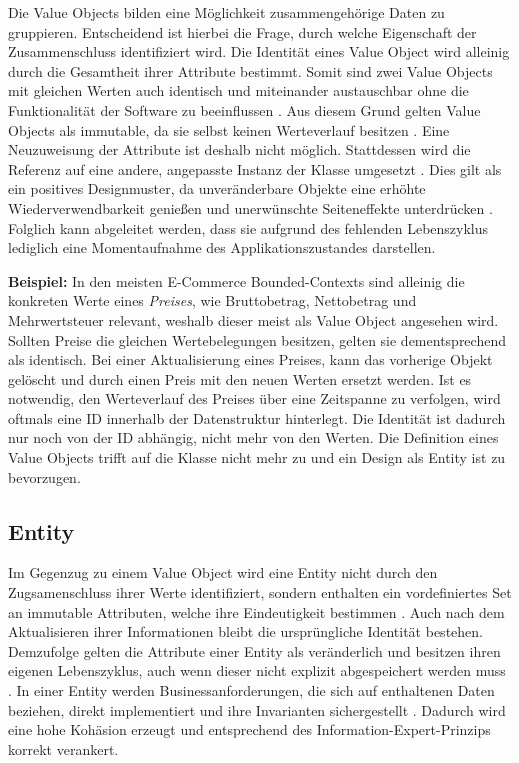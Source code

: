 Die Value Objects bilden eine Möglichkeit zusammengehörige Daten zu gruppieren. Entscheidend ist hierbei die Frage, durch welche Eigenschaft der Zusammenschluss identifiziert wird. Die Identität eines Value Object wird alleinig durch die Gesamtheit ihrer Attribute bestimmt. Somit sind zwei Value Objects mit gleichen Werten auch identisch und miteinander austauschbar ohne die Funktionalität der Software zu beeinflussen \cite[S. 227]{Vernon.2015}. Aus diesem Grund gelten Value Objects als \gls{immutable}, da sie selbst keinen Werteverlauf besitzen \cite[S. 99]{Evans.2011}. Eine Neuzuweisung der Attribute ist deshalb nicht möglich. Stattdessen wird die Referenz auf eine andere, angepasste Instanz der Klasse umgesetzt \cite[S. 226]{Vernon.2015}. Dies gilt als ein positives Designmuster, da unveränderbare Objekte eine erhöhte Wiederverwendbarkeit genießen und unerwünschte Seiteneffekte unterdrücken \cite[S. 228f.]{Vernon.2015}. Folglich kann abgeleitet werden, dass sie aufgrund des fehlenden Lebenszyklus lediglich eine Momentaufnahme des Applikationszustandes darstellen.

\textbf{Beispiel:} In den meisten E-Commerce Bounded-Contexts sind alleinig die konkreten Werte eines \emph{Preises}, wie Bruttobetrag, Nettobetrag und Mehrwertsteuer relevant, weshalb dieser meist als Value Object angesehen wird. Sollten Preise die gleichen Wertebelegungen besitzen, gelten sie dementsprechend als identisch. Bei einer Aktualisierung eines Preises, kann das vorherige Objekt gelöscht und durch einen Preis mit den neuen Werten ersetzt werden. Ist es notwendig, den Werteverlauf des Preises über eine Zeitspanne zu verfolgen, wird oftmals eine ID innerhalb der Datenstruktur hinterlegt. Die Identität ist dadurch nur noch von der ID abhängig, nicht mehr von den Werten. Die Definition eines Value Objects trifft auf die Klasse nicht mehr zu und ein Design als Entity ist zu bevorzugen.  

\subsection{Entity}

Im Gegenzug zu einem Value Object wird eine Entity nicht durch den Zugsamenschluss ihrer Werte identifiziert, sondern enthalten ein vordefiniertes Set an \gls{immutable} Attributen, welche ihre Eindeutigkeit bestimmen \cite[S. 94]{Evans.2011}. Auch nach dem Aktualisieren ihrer Informationen bleibt die ursprüngliche Identität bestehen. Demzufolge gelten die Attribute einer Entity als veränderlich und besitzen ihren eigenen Lebenszyklus, auch wenn dieser nicht explizit abgespeichert werden muss \cite[S. 172]{Vernon.2015}. In einer Entity werden Businessanforderungen, die sich auf enthaltenen Daten beziehen, direkt implementiert und ihre \Gls{Invariante}n sichergestellt \cite[S. 208f.]{Vernon.2015}. Dadurch wird eine hohe Kohäsion erzeugt und entsprechend des \Gls{Information-Expert-Prinzip}s korrekt verankert.

